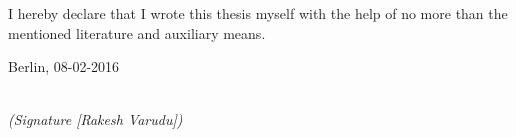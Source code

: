 \newpage

\thispagestyle{empty}

\begin{large}

\vspace*{6cm}

\noindent
I hereby declare that I wrote this thesis myself with the help of no more than the mentioned literature and auxiliary means.
\vspace{2cm}

\noindent
Berlin, 08-02-2016

\vspace{3cm}

\hspace*{7cm}%
\dotfill\\
\hspace*{8.5cm}%
\textit{(Signature [Rakesh Varudu])}

\end{large}
